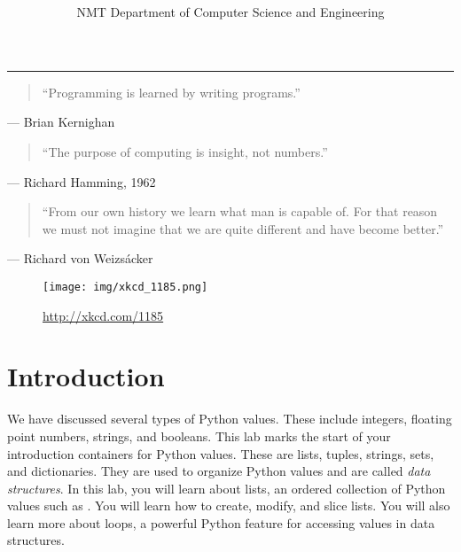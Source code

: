 \documentclass[11pt]{cselabheader}
\title{\vspace{-4em} \thetitle}  %
\author{\theauthor}
\date{NMT Department of Computer Science and Engineering}
\begin{document}
\maketitle
\hrule

\begin{quotation}
``Programming is learned by writing programs.''
\end{quotation}
\begin{flushright}
--- Brian Kernighan
\end{flushright}

\begin{quotation}
``The purpose of computing is insight, not numbers.''
\end{quotation}
\begin{flushright}
--- Richard Hamming, 1962
\end{flushright}

\begin{quotation}
  ``From our own history we learn what man is capable of. For that reason we
  must not imagine that we are quite different and have become better.''
\end{quotation}
\begin{flushright}
  --- Richard von Weizs\'{a}cker
\end{flushright}

\begin{figure}[H]
  \centering
  \texttt{[image: img/xkcd\_1185.png]}
  \caption{\url{http://xkcd.com/1185}}
\end{figure}

\newpage

\section*{Introduction}

We have discussed several types of Python values. These
include integers, floating point numbers, strings, and booleans.  This
lab marks the start of your introduction containers for Python
values. These are lists, tuples, strings, sets, and dictionaries.
They are used to organize Python values and are
called \emph{data structures}.
In this lab, you will learn about lists, an ordered collection of
Python values such as \pythoninline{[1, 2, 3]}. You will learn how to
create, modify, and slice lists. You
will also learn more about  loops, a
powerful Python feature for accessing values in data structures.
\end{document}

